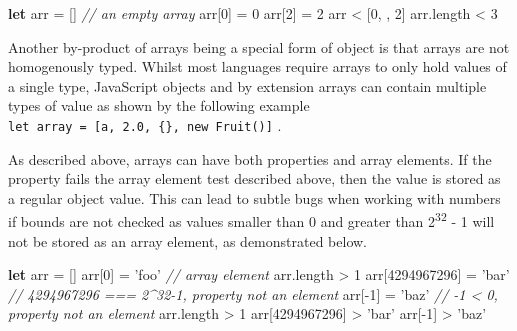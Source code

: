\documentclass[]{article}
\newenvironment{Shaded}{}{}
\newcommand{\AttributeTok}[1]{\textcolor[rgb]{0.49,0.56,0.16}{#1}}
\newcommand{\CommentTok}[1]{\textcolor[rgb]{0.38,0.63,0.69}{\textit{#1}}}
\newcommand{\DecValTok}[1]{\textcolor[rgb]{0.25,0.63,0.44}{#1}}
\newcommand{\KeywordTok}[1]{\textcolor[rgb]{0.00,0.44,0.13}{\textbf{#1}}}
\newcommand{\NormalTok}[1]{#1}
\newcommand{\OperatorTok}[1]{\textcolor[rgb]{0.40,0.40,0.40}{#1}}
\newcommand{\StringTok}[1]{\textcolor[rgb]{0.25,0.44,0.63}{#1}}
\newcommand{\VariableTok}[1]{\textcolor[rgb]{0.10,0.09,0.49}{#1}}
\begin{document}
\begin{Shaded}
\begin{Highlighting}[]
\KeywordTok{let}\NormalTok{ arr }\OperatorTok{=}\NormalTok{ [] }\CommentTok{// an empty array}
\NormalTok{arr[}\DecValTok{0}\NormalTok{] }\OperatorTok{=} \DecValTok{0}
\NormalTok{arr[}\DecValTok{2}\NormalTok{] }\OperatorTok{=} \DecValTok{2}
\NormalTok{arr}
\OperatorTok{<}\NormalTok{ [}\DecValTok{0}\OperatorTok{,} \OperatorTok{,} \DecValTok{2}\NormalTok{]}
\VariableTok{arr}\NormalTok{.}\AttributeTok{length} 
\OperatorTok{<} \DecValTok{3}
\end{Highlighting}
\end{Shaded}

Another by-product of arrays being a special form of object is that
arrays are not homogenously typed. Whilst most languages require arrays
to only hold values of a single type, JavaScript objects and by
extension arrays can contain multiple types of value as shown by the
following example
\texttt{let\ array\ =\ {[}\textquotesingle{}a\textquotesingle{},\ 2.0,\ \{\},\ new\ Fruit(){]}}
.

As described above, arrays can have both properties and array elements.
If the property fails the array element test described above, then the
value is stored as a regular object value. This can lead to subtle bugs
when working with numbers if bounds are not checked as values smaller
than 0 and greater than 2\textsuperscript{32} - 1 will not be stored as
an array element, as demonstrated below.

\begin{Shaded}
\begin{Highlighting}[]
\KeywordTok{let}\NormalTok{ arr }\OperatorTok{=}\NormalTok{ []}
\NormalTok{arr[}\DecValTok{0}\NormalTok{] }\OperatorTok{=} \StringTok{'foo'} \CommentTok{// array element}
\VariableTok{arr}\NormalTok{.}\AttributeTok{length}
\OperatorTok{>} \DecValTok{1}
\NormalTok{arr[}\DecValTok{4294967296}\NormalTok{] }\OperatorTok{=} \StringTok{'bar'} \CommentTok{// 4294967296 === 2^32-1, property not an element}
\NormalTok{arr[}\OperatorTok{-}\DecValTok{1}\NormalTok{] }\OperatorTok{=} \StringTok{'baz'} \CommentTok{// -1 < 0, property not an element}
\VariableTok{arr}\NormalTok{.}\AttributeTok{length}
\OperatorTok{>} \DecValTok{1}
\NormalTok{arr[}\DecValTok{4294967296}\NormalTok{]}
\OperatorTok{>} \StringTok{'bar'}
\NormalTok{arr[}\OperatorTok{-}\DecValTok{1}\NormalTok{]}
\OperatorTok{>} \StringTok{'baz'}
\end{Highlighting}
\end{Shaded}
\end{document}
